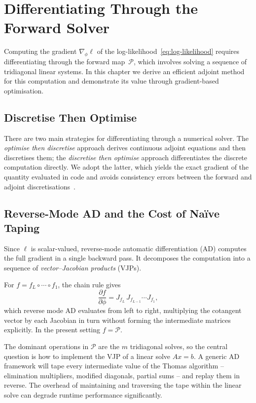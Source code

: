 \chapter{Differentiating Through the Forward Solver}\label{ch:adjoint}

Computing the gradient $\nabla_\phi \ell$ of the
log-likelihood~\cref{eq:log-likelihood} requires differentiating through
the forward map~$\mathcal{P}$, which involves solving a sequence of
tridiagonal linear systems. In this chapter we derive an efficient adjoint
method for this computation and demonstrate its value through gradient-based
optimisation.

\section{Discretise Then Optimise}\label{sec:disc-then-opt}

There are two main strategies for differentiating through a numerical solver.
The \emph{optimise then discretise} approach derives continuous adjoint
equations and then discretises them; the \emph{discretise then optimise}
approach differentiates the discrete computation directly. We adopt the
latter, which yields the exact gradient of the quantity evaluated in code
and avoids consistency errors between the forward and adjoint
discretisations~\cite{kidger2021neural}.

\section{Reverse-Mode AD and the Cost of Na\"ive Taping}%
\label{sec:reverse-ad}

Since $\ell$ is scalar-valued, reverse-mode automatic differentiation
(AD) computes the full gradient in a single backward pass. It
decomposes the computation into a sequence of
\emph{vector--Jacobian products} (VJPs).

For $f = f_L \circ \cdots \circ f_1$, the chain rule gives
\begin{equation}
  \frac{\partial f}{\partial \phi}
  = J_{f_L}\, J_{f_{L-1}} \cdots J_{f_1},
  \label{eq:chain-rule}
\end{equation}
which reverse mode AD evaluates from left to right, multiplying the
cotangent vector by each Jacobian in turn without forming the
intermediate matrices explicitly. In the present setting $f = \mathcal{P}$.

The dominant operations in $\mathcal{P}$ are the $m$ tridiagonal solves, so the
central question is how to implement the VJP of a linear solve $Ax =
b$. A generic AD framework will tape every intermediate value of the
Thomas algorithm -- elimination multipliers, modified diagonals,
partial sums -- and replay them in reverse. The overhead of
maintaining and traversing the tape within the linear solve can
degrade runtime performance significantly.

